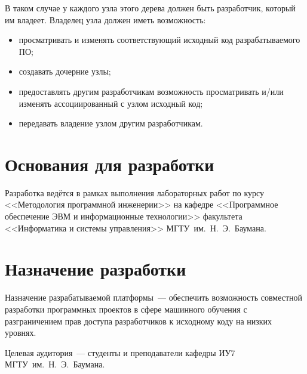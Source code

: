 \documentclass{bmstu}
\begin{document}
  В таком случае у каждого узла этого дерева должен быть разработчик,
  который им владеет.
  Владелец узла должен иметь возможность:
  \begin{itemize}[label=---]
    \item просматривать и изменять соответствующий исходный код
      разрабатываемого ПО;
    \item создавать дочерние узлы;
    \item предоставлять другим разработчикам возможность просматривать
      и/или изменять ассоциированный с узлом исходный код;
    \item передавать владение узлом другим разработчикам.
  \end{itemize}

  \section{Основания для разработки}

  Разработка ведётся в рамках выполнения лабораторных работ по курсу
  <<Методология программной инженерии>> на кафедре <<Программное
  обеспечение ЭВМ и информационные технологии>> факультета
  <<Информатика и системы управления>> МГТУ~им.~Н.~Э.~Баумана.

  \section{Назначение разработки}

  Назначение разрабатываемой платформы~--- обеспечить возможность
  совместной разработки программных проектов в сфере машинного
  обучения с разграничением прав доступа разработчиков к исходному
  коду на низких уровнях.

  Целевая аудитория~--- студенты и преподаватели кафедры ИУ7
  \mbox{МГТУ~им.~Н.~Э.~Баумана}.
\end{document}
